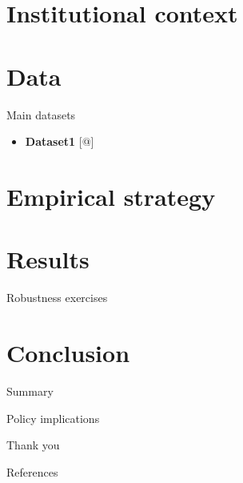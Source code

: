 \documentclass[
  ignorenonframetext,
  aspectratio=169]{beamer}
\providecommand{\tightlist}{%
  \setlength{\itemsep}{0pt}\setlength{\parskip}{0pt}}
\newlength{\cslhangindent}
\newlength{\cslentryspacingunit} %
\newenvironment{CSLReferences}[2] %
 {%
  \setlength{\parindent}{0pt}
  \ifodd #1
  \let\oldpar\par
  \def\par{\hangindent=\cslhangindent\oldpar}
  \fi
  \setlength{\parskip}{#2\cslentryspacingunit}
 }%
 {}
\newcommand{\backupend}{
   \setcounter{framenumber}{\value{finalframe}}
}
\begin{document}
\hypertarget{institutional-context}{%
\section{Institutional context}\label{institutional-context}}

\hypertarget{data}{%
\section{Data}\label{data}}

\begin{frame}{Main datasets}
\protect\hypertarget{main-datasets}{}
\begin{itemize}
\tightlist
\item
  \textbf{Dataset1} {[}@{]}
\end{itemize}
\end{frame}

\hypertarget{empirical-strategy}{%
\section{Empirical strategy}\label{empirical-strategy}}

\hypertarget{results}{%
\section{Results}\label{results}}

\begin{frame}{Robustness exercises}
\protect\hypertarget{robustness-exercises}{}
\label{robustness}
\end{frame}

\hypertarget{conclusion}{%
\section{Conclusion}\label{conclusion}}

\begin{frame}{Summary}
\protect\hypertarget{summary}{}
\label{conclusion}
\end{frame}

\begin{frame}{Policy implications}
\protect\hypertarget{policy-implications}{}
\setcounter{finalframe}{\value{framenumber}}
\end{frame}

\begin{frame}[plain]
\begin{center}
\Large Thank you
\end{center}
\end{frame}

\appendix
\begin{frame}[allowframebreaks]{References}

\tiny

\hypertarget{refs}{}
\begin{CSLReferences}{0}{0}
\end{CSLReferences}

\backupend
\end{frame}
\end{document}
